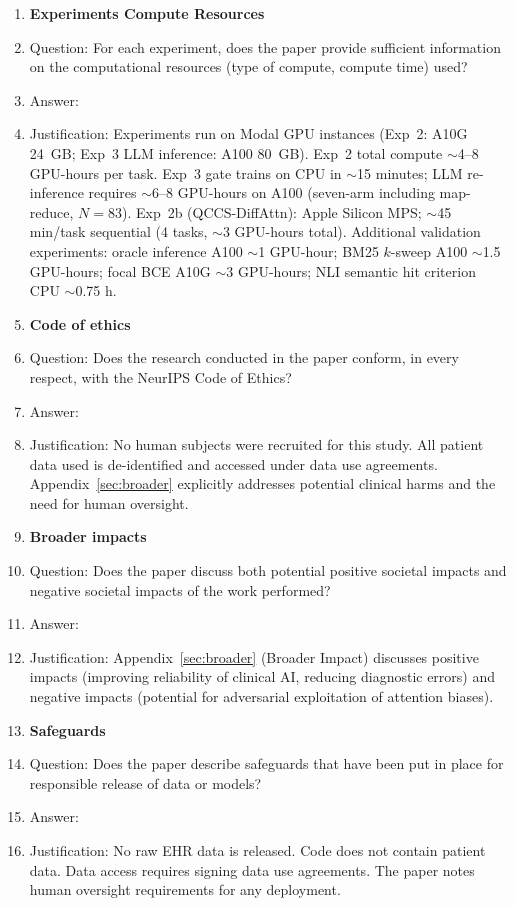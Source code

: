 \documentclass{article}
\begin{document}
\begin{enumerate}
\item {\bf Experiments Compute Resources}
  \item[] Question: For each experiment, does the paper provide sufficient
    information on the computational resources (type of compute, compute time)
    used?
  \item[] Answer: \answerYes{}
  \item[] Justification: Experiments run on Modal GPU instances (Exp~2: A10G
    24~GB; Exp~3 LLM inference: A100 80~GB). Exp~2 total compute $\sim$4--8
    GPU-hours per task. Exp~3 gate trains on CPU in $\sim$15 minutes;
    LLM re-inference requires $\sim$6--8 GPU-hours on A100 (seven-arm including
    map-reduce, $N{=}83$). Exp~2b (QCCS-DiffAttn): Apple Silicon MPS;
    $\sim$45 min/task sequential (4 tasks, $\sim$3 GPU-hours total).
    Additional validation experiments: oracle inference A100 $\sim$1 GPU-hour;
    BM25 $k$-sweep A100 $\sim$1.5 GPU-hours; focal BCE A10G $\sim$3 GPU-hours;
    NLI semantic hit criterion CPU $\sim$0.75 h.

\item {\bf Code of ethics}
  \item[] Question: Does the research conducted in the paper conform, in every
    respect, with the NeurIPS Code of Ethics?
  \item[] Answer: \answerYes{}
  \item[] Justification: No human subjects were recruited for this study.
    All patient data used is de-identified and accessed under data use
    agreements. Appendix~\ref{sec:broader} explicitly addresses potential
    clinical harms and the need for human oversight.

\item {\bf Broader impacts}
  \item[] Question: Does the paper discuss both potential positive societal
    impacts and negative societal impacts of the work performed?
  \item[] Answer: \answerYes{}
  \item[] Justification: Appendix~\ref{sec:broader} (Broader Impact) discusses
    positive impacts (improving reliability of clinical AI, reducing diagnostic
    errors) and negative impacts (potential for adversarial exploitation of
    attention biases).

\item {\bf Safeguards}
  \item[] Question: Does the paper describe safeguards that have been put in
    place for responsible release of data or models?
  \item[] Answer: \answerYes{}
  \item[] Justification: No raw EHR data is released. Code does not contain
    patient data. Data access requires signing data use agreements.
    The paper notes human oversight requirements for any deployment.


\end{enumerate}
\end{document}
